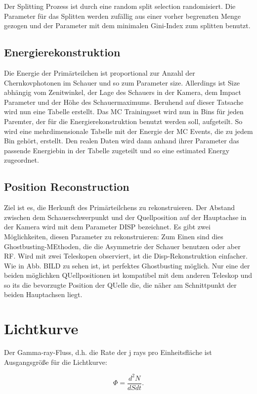Der Splitting Prozess ist durch eine random split selection randomisiert.
Die Parameter für das Splitten werden zufällig aus einer vorher begrenzten Menge gezogen und der Parameter mit dem minimalen Gini-Index zum splitten benutzt.

\subsection{Energierekonstruktion}
Die Energie der Primärteilchen ist proportional zur Anzahl der Chernkovphotonen im Schauer und so zum Parameter size.
Allerdings ist Size abhängig vom Zenitwinkel, der Lage des Schauers in der Kamera, dem Impact Parameter und der Höhe des Schauermaximums.
Beruhend auf dieser Tatsache wird nun eine Tabelle erstellt.
Das MC Trainingsset wird nun in Bins für jeden Paremter, der für die Energierekonstruktion benutzt werden soll, aufgeteilt.
So wird eine mehrdimensionale Tabelle mit der Energie der MC Events, die zu jedem Bin gehört, erstellt.
Den realen Daten wird dann anhand ihrer Parameter das passende Energiebin in der Tabelle zugeteilt und so eine estimated Energy zugeordnet.


\subsection{Position Reconstruction}
Ziel ist es, die Herkunft des Primärteilchens zu rekonstruieren. 
Der Abstand zwischen dem Schauerschwerpunkt und der Quellposition auf der Hauptachse in der Kamera wird mit dem Parameter DISP bezeichnet.
Es gibt zwei Möglichkeiten, diesen Parameter zu rekonstruieren: Zum Einen sind dies Ghostbusting-MEthoden, die die Asymmetrie der Schauer benutzen oder aber RF.
Wird mit zwei Teleskopen observiert, ist die Disp-Rekonstruktion einfacher.
Wie in Abb. BILD zu sehen ist, ist perfektes Ghostbusting möglich.
Nur eine der beiden möglichken QUellpositionen ist kompatibel mit dem anderen Teleskop und so its die bevorzugte Position der QUelle die, die näher am Schnittpunkt der beiden Hauptachsen liegt.



\section{Lichtkurve}
Der Gamma-ray-Fluss, d.h. die Rate der j rays pro Einheitsfläche ist Ausgangsgröße für die Lichtkurve:

\begin{equation}
 \Phi=\frac{d^2 N}{dS dt}. 
\end{equation}

